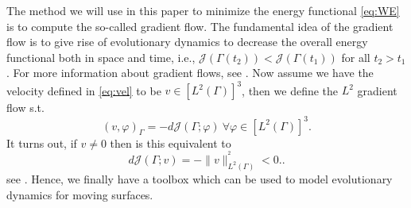 The method we will use in this paper to minimize the energy functional \eqref{eq:WE} is to compute the so-called gradient flow. The fundamental idea of the gradient flow is to give rise of evolutionary dynamics to decrease the overall energy
functional both in space and time, i.e., $\mathcal{J}\left( \Gamma \left( t_{2} \right)  \right) <   \mathcal{J}\left( \Gamma \left( t_{1} \right)\right)$ for all  $t_{2} > t_{1}$. For more information about gradient flows, see
    \cite{dogan2007discrete, dogan2005finite}. Now assume we have the velocity defined in \eqref{eq:vel} to be $v \in \left[ L^{2}\left( \Gamma  \right)  \right]^3 $, then we define the $L^2$  gradient flow s.t. \[
      \left( v,\varphi  \right) _{\Gamma  }  = - d \mathcal{J} \left( \Gamma ; \varphi  \right) \  \forall \varphi \in \left[ L^2\left( \Gamma  \right)   \right] ^3.
    \]
    It turns out, if $v \neq 0$ then is this equivalent to
    \begin{equation}
    \label{eq:gradient_flow}
d \mathcal{J} \left( \Gamma ; v \right) = -\| v \|_{ L^2\left( \Gamma  \right)  }^{^2  } < 0.
    .\end{equation}
see \cite{ito2008variational}.
Hence, we finally have a toolbox which can be used to model evolutionary dynamics for moving surfaces.











